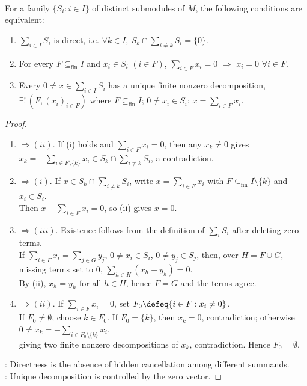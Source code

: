 \begin{proposition} \label{prop:module-direct-sum-characterizations} \\
For a family $\{S_i:i\in I\}$ of distinct submodules of $M$, the following conditions are equivalent:
\begin{enumerate}[label=(\roman*)]
\setlength{\itemsep}{0pt}
\item $\sum\limits_{i\in I}S_i$ is direct, i.e. $\forall k\in I,\ S_k\cap\sum\limits_{i\neq k}S_i=\{0\}$.
\item For every $F\subseteq_{\operatorname{fin}} I$ and $x_i\in S_i$ $(i\in F)$, $\sum\limits_{i\in F}x_i=0$ $\Longrightarrow$ $x_i=0$ $\forall i \in F$.
\item Every $0\neq x\in\sum_{i\in I}S_i$ has a unique finite nonzero decomposition,\\
$\exists!\,(F,(x_i)_{i\in F})$ where $F\subseteq_{\operatorname{fin}} I$; $0\neq x_i\in S_i$; $x=\sum\limits_{i\in F}x_i$.
\end{enumerate}
\begin{proof}
\begin{enumerate}[label=(\roman*).]
\setlength{\itemsep}{0pt}
\item[$(i)$]$\Rightarrow (ii)$. If (i) holds and $\sum\limits_{i\in F}x_i=0$, then any $x_k\neq0$ gives $x_k=-\sum\limits_{i\in F\setminus\{k\}}x_i\in S_k\cap\sum\limits_{i\neq k}S_i$, a contradiction.
\item[$(ii)$]$\Rightarrow (i)$. If $x\in S_k\cap\sum\limits_{i\neq k}S_i$, write $x=\sum\limits_{i\in F}x_i$ with $F\subseteq_{\operatorname{fin}} I\setminus\{k\}$ and $x_i\in S_i$.\\
Then $x-\sum\limits_{i\in F}x_i=0$, so (ii) gives $x=0$.
\item[$(ii)$]$\Rightarrow (iii)$. Existence follows from the definition of $\sum_i S_i$ after deleting zero terms.\\
If $\sum\limits_{i\in F}x_i=\sum\limits_{j\in G}y_j$, $0\neq x_i\in S_i$, $0\neq y_j\in S_j$, then, over $H=F\cup G$, missing terms set to $0$, $\sum\limits_{h\in H}(x_h-y_h)=0$.\\
By (ii), $x_h=y_h$ for all $h\in H$, hence $F=G$ and the terms agree.
\item[$(iii)$]$\Rightarrow (ii)$. If $\sum_{i\in F}x_i=0$, set $F_0\defeq\{i\in F:x_i\neq0\}$.\\
If $F_0\neq\emptyset$, choose $k\in F_0$. If $F_0=\{k\}$, then $x_k=0$, contradiction; otherwise $0\neq x_k=-\sum\limits_{i\in F_0\setminus\{k\}}x_i$,\\
giving two finite nonzero decompositions of $x_k$, contradiction. Hence $F_0=\emptyset$.
\end{enumerate}
: Directness is the absence of hidden cancellation among different summands.\\
: Unique decomposition is controlled by the zero vector.
\end{proof}
\end{proposition}

